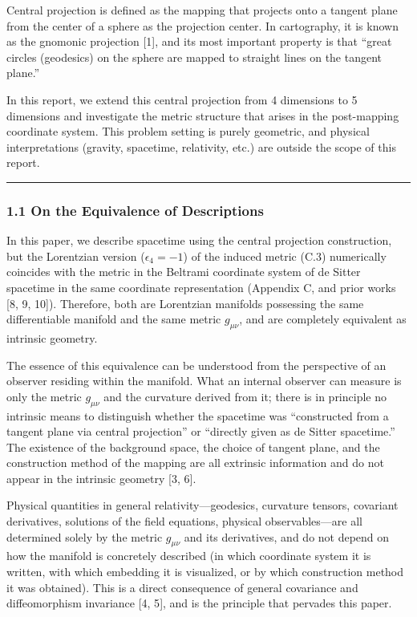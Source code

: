 \documentclass[a4paper,11pt]{article}
\theoremstyle{definition}
\begin{document}
Central projection is defined as the mapping that projects onto a tangent plane from the center of a sphere as the projection center. In cartography, it is known as the gnomonic projection {[}1{]}, and its most important property is that ``great circles (geodesics) on the sphere are mapped to straight lines on the tangent plane.''

In this report, we extend this central projection from 4 dimensions to 5 dimensions and investigate the metric structure that arises in the post-mapping coordinate system. This problem setting is purely geometric, and physical interpretations (gravity, spacetime, relativity, etc.) are outside the scope of this report.

\begin{center}\rule{0.5\linewidth}{0.5pt}\end{center}

\subsubsection{1.1 On the Equivalence of Descriptions}\label{on-the-equivalence-of-descriptions}

In this paper, we describe spacetime using the central projection construction, but the Lorentzian version (\(\epsilon_4 = -1\)) of the induced metric (C.3) numerically coincides with the metric in the Beltrami coordinate system of de Sitter spacetime in the same coordinate representation (Appendix C, and prior works {[}8, 9, 10{]}). Therefore, both are Lorentzian manifolds possessing the same differentiable manifold and the same metric \(g_{\mu\nu}\), and are completely equivalent as intrinsic geometry.

The essence of this equivalence can be understood from the perspective of an observer residing within the manifold. What an internal observer can measure is only the metric \(g_{\mu\nu}\) and the curvature derived from it; there is in principle no intrinsic means to distinguish whether the spacetime was ``constructed from a tangent plane via central projection'' or ``directly given as de Sitter spacetime.'' The existence of the background space, the choice of tangent plane, and the construction method of the mapping are all extrinsic information and do not appear in the intrinsic geometry {[}3, 6{]}.

Physical quantities in general relativity---geodesics, curvature tensors, covariant derivatives, solutions of the field equations, physical observables---are all determined solely by the metric \(g_{\mu\nu}\) and its derivatives, and do not depend on how the manifold is concretely described (in which coordinate system it is written, with which embedding it is visualized, or by which construction method it was obtained). This is a direct consequence of general covariance and diffeomorphism invariance {[}4, 5{]}, and is the principle that pervades this paper.
\end{document}
